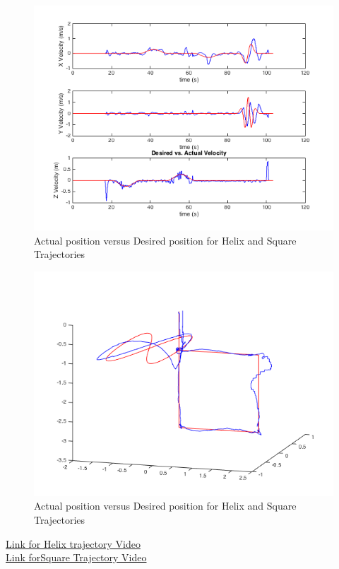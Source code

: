 \documentclass[english, twocolumn]{article}
\begin{document}
\begin{figure}[h!]
\includegraphics[width = \linewidth]{helix_square_vel.png}
\caption{Actual position versus Desired position for Helix and Square Trajectories}
\label{fig:helix_square1}
\end{figure}
\begin{figure}[h!]
\includegraphics[width = \linewidth]{helix_square_3d.png}
\caption{Actual position versus Desired position for Helix and Square Trajectories}
\label{fig:helix_square2}
\end{figure}
\href{https://www.youtube.com/watch?v=sI6rJ2HQ4nc}{Link for Helix trajectory Video}
\\
\href{https://www.youtube.com/watch?v=-9Lq45Qe26Q}{Link forSquare Trajectory Video}
\end{document}
